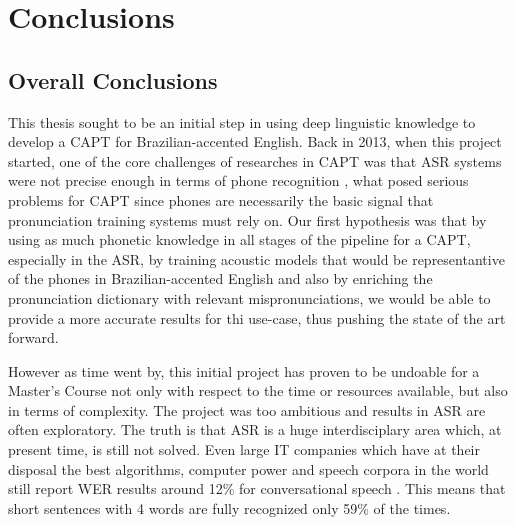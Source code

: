 \chapter{Conclusions}\label{ch:conclusions}

\section*{Overall Conclusions}\label{sec:overall-conclusions}

This thesis sought to be an initial step in using deep linguistic knowledge to develop a \ac{CAPT} for Brazilian-accented English. Back in 2013, when this project started, one of the core challenges of researches in \ac{CAPT} was that \ac{ASR} systems were not precise enough in terms of phone recognition \cite{Witt2012}, what posed serious problems for \ac{CAPT} since phones are necessarily the basic signal that pronunciation training systems must rely on. Our first hypothesis was that by using as much phonetic knowledge in all stages of the pipeline for a \ac{CAPT}, especially in the \ac{ASR}, by training acoustic models that would be representantive of the phones in Brazilian-accented English and also by enriching the pronunciation dictionary with relevant mispronunciations, we would be able to provide a more accurate results for thi use-case, thus pushing the state of the art forward.

However as time went by, this initial project has proven to be undoable for a Master's Course not only with respect to the time or resources available, but also in terms of complexity. The project was too ambitious and results in \ac{ASR} are often exploratory. The truth is that \ac{ASR} is a huge interdisciplary area which, at present time, is still not solved. Even large IT companies which have at their disposal the best algorithms, computer power and speech corpora in the world still report \ac{WER} results around 12\% for conversational speech  \cite{Huang2014}. This means that short sentences with 4 words are fully recognized only 59\% of the times. 

